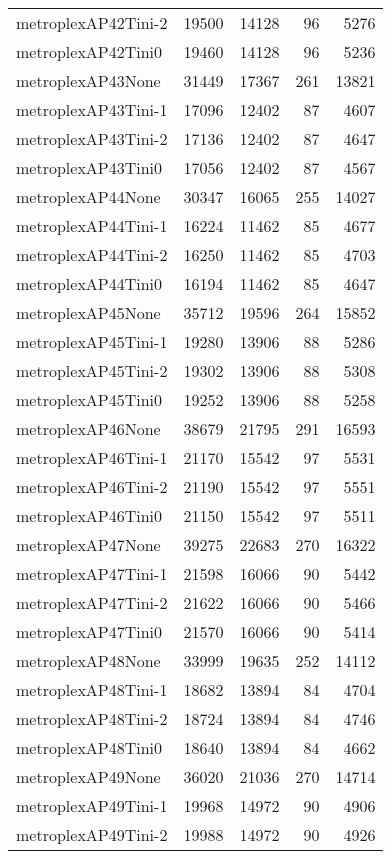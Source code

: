 \begin{longtable}{lrrrr}
metroplexAP42Tini-2 & 19500 & 14128 & 96 & 5276 \\
metroplexAP42Tini0 & 19460 & 14128 & 96 & 5236 \\
metroplexAP43None & 31449 & 17367 & 261 & 13821 \\
metroplexAP43Tini-1 & 17096 & 12402 & 87 & 4607 \\
metroplexAP43Tini-2 & 17136 & 12402 & 87 & 4647 \\
metroplexAP43Tini0 & 17056 & 12402 & 87 & 4567 \\
metroplexAP44None & 30347 & 16065 & 255 & 14027 \\
metroplexAP44Tini-1 & 16224 & 11462 & 85 & 4677 \\
metroplexAP44Tini-2 & 16250 & 11462 & 85 & 4703 \\
metroplexAP44Tini0 & 16194 & 11462 & 85 & 4647 \\
metroplexAP45None & 35712 & 19596 & 264 & 15852 \\
metroplexAP45Tini-1 & 19280 & 13906 & 88 & 5286 \\
metroplexAP45Tini-2 & 19302 & 13906 & 88 & 5308 \\
metroplexAP45Tini0 & 19252 & 13906 & 88 & 5258 \\
metroplexAP46None & 38679 & 21795 & 291 & 16593 \\
metroplexAP46Tini-1 & 21170 & 15542 & 97 & 5531 \\
metroplexAP46Tini-2 & 21190 & 15542 & 97 & 5551 \\
metroplexAP46Tini0 & 21150 & 15542 & 97 & 5511 \\
metroplexAP47None & 39275 & 22683 & 270 & 16322 \\
metroplexAP47Tini-1 & 21598 & 16066 & 90 & 5442 \\
metroplexAP47Tini-2 & 21622 & 16066 & 90 & 5466 \\
metroplexAP47Tini0 & 21570 & 16066 & 90 & 5414 \\
metroplexAP48None & 33999 & 19635 & 252 & 14112 \\
metroplexAP48Tini-1 & 18682 & 13894 & 84 & 4704 \\
metroplexAP48Tini-2 & 18724 & 13894 & 84 & 4746 \\
metroplexAP48Tini0 & 18640 & 13894 & 84 & 4662 \\
metroplexAP49None & 36020 & 21036 & 270 & 14714 \\
metroplexAP49Tini-1 & 19968 & 14972 & 90 & 4906 \\
metroplexAP49Tini-2 & 19988 & 14972 & 90 & 4926 \\

\end{longtable}
